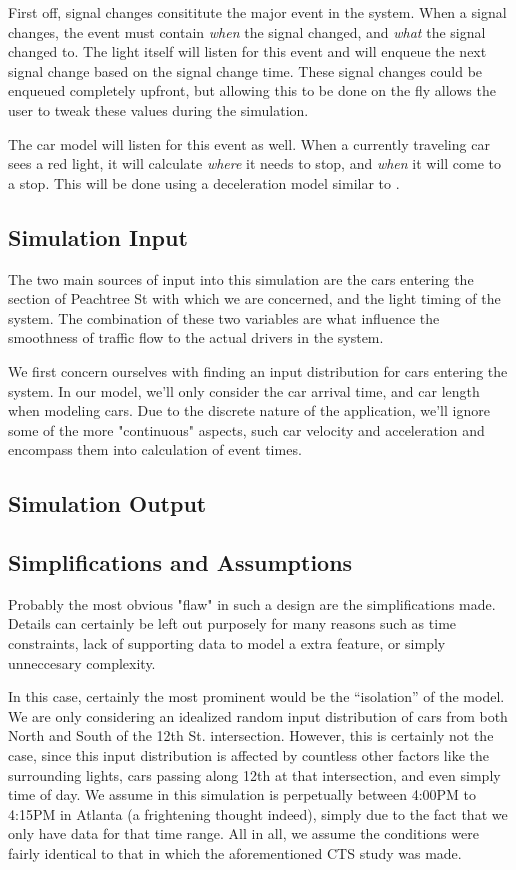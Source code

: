 \documentclass[a4paper,12pt]{article}
\begin{document}
First off, signal changes consititute the major event in the system. When a signal changes, the event must contain
\emph{when} the signal changed, and \emph{what} the signal changed to. The light itself will listen for this event
and will enqueue the next signal change based on the signal change time. These signal changes could be enqueued
completely upfront, but allowing this to be done on the fly allows the user to tweak these values during the simulation.

The car model will listen for this event as well. When a currently traveling car sees a red light, it will calculate
\emph{where} it needs to stop, and \emph{when} it will come to a stop. This will be done using a deceleration model
similar to \cite{deceleration}.



\subsection{Simulation Input}
The two main sources of input into this simulation are the cars entering the section of Peachtree St with which we are
concerned, and the light timing of the system. The combination of these two variables are what influence the smoothness
of traffic flow to the actual drivers in the system.

We first concern ourselves with finding an input distribution for cars entering the system. In our model, we'll only
consider the car arrival time, and car length when modeling cars. Due to the discrete nature of the application, we'll
ignore some of the more "continuous" aspects, such car velocity and acceleration and encompass them into calculation
of event times.

\subsection{Simulation Output}

\subsection{Simplifications and Assumptions}
Probably the most obvious "flaw" in such a design are the simplifications made. Details can certainly be left out
purposely for many reasons such as time constraints, lack of supporting data to model a extra feature, or simply
unneccesary complexity.

In this case, certainly the most prominent would be the ``isolation'' of the model. We are only considering an
idealized random input distribution of cars from both North and South of the 12th St. intersection. However, this is
certainly not the case, since this input distribution is affected by countless other factors like the surrounding
lights, cars passing along 12th at that intersection, and even simply time of day. We assume in this simulation is
perpetually between 4:00PM to 4:15PM in Atlanta (a frightening thought indeed), simply due to the fact that we only
have data for that time range. All in all, we assume the conditions were fairly identical to that in which the 
aforementioned CTS study was made.
\end{document}
